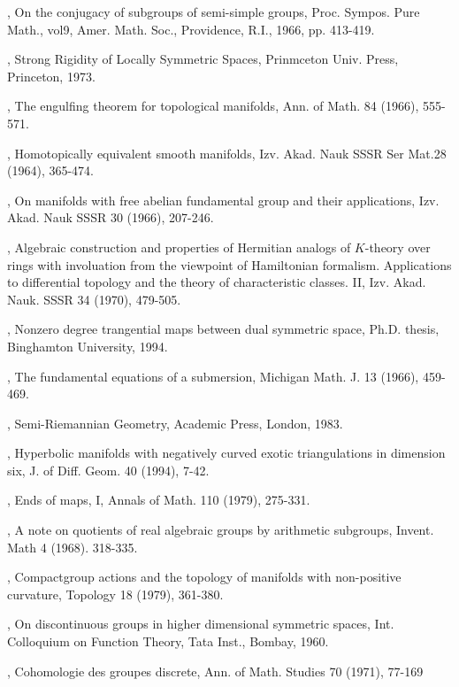 \begin{thebibliography}{99}
, On the conjugacy of subgroups of
  semi-simple groups, Proc. Sympos. Pure Math., vol9,
  Amer. Math. Soc., Providence, R.I., 1966, pp. 413-419. 

, Strong Rigidity of Locally Symmetric
  Spaces, Prinmceton Univ. Press, Princeton, 1973.

, The engulfing theorem for topological
  manifolds, Ann. of Math. 84 (1966), 555-571.

, Homotopically equivalent smooth manifolds,
  Izv. Akad. Nauk SSSR Ser Mat.28 (1964), 365-474.

, On manifolds with free abelian fundamental
  group and their applications, Izv. Akad. Nauk SSSR 30 (1966), 207-246.

, Algebraic construction and properties of
  Hermitian analogs of $K$-theory over rings with involuation from the
  viewpoint of Hamiltonian formalism. Applications to differential
  topology and the theory of characteristic classes. II,
  Izv. Akad. Nauk. SSSR 34 (1970), 479-505.

, Nonzero degree trangential maps between dual
  symmetric space, Ph.D. thesis, Binghamton University, 1994.

, The fundamental equations of a submersion,
  Michigan Math. J. 13 (1966), 459-469.

, Semi-Riemannian Geometry, Academic Press,
  London, 1983. 

, Hyperbolic manifolds with negatively curved
  exotic triangulations in dimension six, J. of Diff. Geom. 40 (1994),
  7-42. 

, Ends of maps, I, Annals of Math. 110 (1979), 275-331.

, A note on quotients of real algebraic
  groups by arithmetic subgroups, Invent. Math 4 (1968). 318-335.

, Compact\pageoriginale group actions and the
  topology of manifolds with non-positive curvature, Topology 18
  (1979), 361-380. 

, On discontinuous groups in higher
  dimensional symmetric spaces, Int. Colloquium on Function Theory,
  Tata Inst., Bombay, 1960.

, Cohomologie des groupes discrete, Ann. of
  Math. Studies 70 (1971), 77-169


\end{thebibliography}
